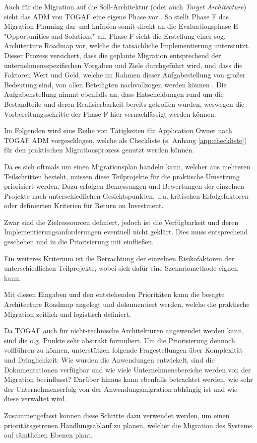 Auch für die Migration auf die Soll-Architektur (oder auch \textit{Target Architecture}) sieht das ADM von TOGAF eine eigene Phase vor \cite{TOGAFDocs}. So stellt Phase F das Migration Planning dar und knüpfen somit direkt an die Evaluationsphase E "Opportunities and Solutions" an. Phase F sieht die Erstellung einer sog. Architecture Roadmap vor, welche die tatsächliche Implementierung unterstützt. Dieser Prozess versichert, dass die geplante Migration entsprechend der unternehmensspezifischen Vorgaben und Ziele durchgeführt wird, und dass die Faktoren Wert und Geld, welche im Rahmen dieser Aufgabestellung von großer Bedeutung sind, von allen Beteiligten nachvollzogen werden können \cite{VisualParadigmTOGAF}. Die Aufgabenstellung nimmt ebenfalls an, dass Entscheidungen rund um die Bestandteile und deren Realisierbarkeit bereits getroffen wurden, weswegen die Vorbereitungsschritte der Phase F hier vernachlässigt werden können.

Im Folgenden wird eine Reihe von Tätigkeiten für Application Owner nach TOGAF ADM vorgeschlagen, welche als Checkliste (s. Anhang \ref{app:checkliste}) für den praktischen Migrationsprozess genutzt werden können.

Da es sich oftmals um einen Migrationsplan handeln kann, welcher aus mehreren Teilschritten besteht, müssen diese Teilprojekte für die praktische Umsetzung priorisiert werden. Dazu erfolgen Bemessungen und Bewertungen der einzelnen Projekte nach unterschiedlichen Gesichtspunkten, u.a. kritischen Erfolgsfaktoren oder definierten Kriterien für Return on Investment.

Zwar sind die Zielressourcen definiert, jedoch ist die Verfügbarkeit und deren Implementierungsanforderungen eventuell nicht geklärt. Dies muss entsprechend geschehen und in die Priorisierung mit einfließen.

Ein weiteres Kriterium ist die Betrachtung der einzelnen Risikofaktoren der unterschiedlichen Teilprojekte, wobei sich dafür eine Szenariomethode eignen kann.

Mit diesen Eingaben und den entstehenden Prioritäten kann die besagte Architecture Roadmap angelegt und dokumentiert werden, welche die praktische Migration zeitlich und logistisch definiert.

Da TOGAF auch für nicht-technische Architekturen angewendet werden kann, sind die o.g. Punkte sehr abstrakt formuliert. Um die Priorisierung dennoch vollführen zu können, unterstützen folgende Fragestellungen über Komplexität und Dringlichkeit: Wie wurden die Anwendungen entwickelt, sind die Dokumentationen verfügbar und wie viele Unternehmensbereiche werden von der Migration beeinflusst? Darüber hinaus kann ebenfalls betrachtet werden, wie sehr der Unternehmenserfolg von der Anwendungsmigration abhängig ist und wie diese verwaltet wird.

Zusammengefasst können diese Schritte dazu verwendet werden, um einen prioritätsgetreuen Handlungsablauf zu planen, welcher die Migration des Systems auf sämtlichen Ebenen plant.
